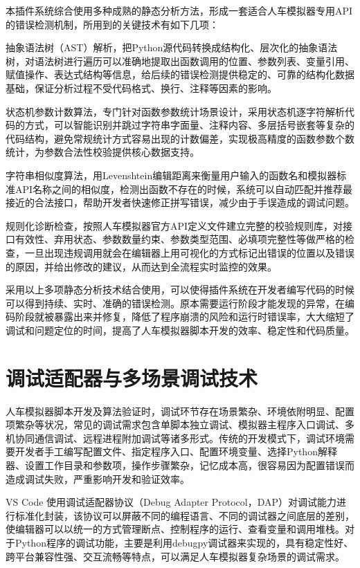 本插件系统综合使用多种成熟的静态分析方法，形成一套适合人车模拟器专用API的错误检测机制，所用到的关键技术有如下几项：

抽象语法树（AST）解析，把Python源代码转换成结构化、层次化的抽象语法树，对语法树进行遍历可以准确地提取出函数调用的位置、参数列表、变量引用、赋值操作、表达式结构等信息，给后续的错误检测提供稳定的、可靠的结构化数据基础，保证分析过程不受代码格式、换行、注释等因素的影响。

状态机参数计数算法，专门针对函数参数统计场景设计，采用状态机逐字符解析代码的方式，可以智能识别并跳过字符串字面量、注释内容、多层括号嵌套等复杂的代码结构，避免常规统计方式容易出现的计数偏差，实现极高精度的函数参数个数统计，为参数合法性校验提供核心数据支持。

字符串相似度算法，用Levenshtein编辑距离来衡量用户输入的函数名和模拟器标准API名称之间的相似度，检测出函数不存在的时候，系统可以自动匹配并推荐最接近的合法接口，帮助开发者快速修正拼写错误，减少由于手误造成的调试问题。

规则化诊断检查，按照人车模拟器官方API定义文件建立完整的校验规则库，对接口有效性、弃用状态、参数数量约束、参数类型范围、必填项完整性等做严格的检查，一旦出现违规调用就会在编辑器上用可视化的方式标记出错误的位置以及错误的原因，并给出修改的建议，从而达到全流程实时监控的效果。

采用以上多项静态分析技术结合使用，可以使得插件系统在开发者编写代码的时候可以得到持续、实时、准确的错误检测。原本需要运行阶段才能发现的异常，在编码阶段就被暴露出来并修复，降低了程序崩溃的风险和运行时错误率，大大缩短了调试和问题定位的时间，提高了人车模拟器脚本开发的效率、稳定性和代码质量。

\section{调试适配器与多场景调试技术}

人车模拟器脚本开发及算法验证时，调试环节存在场景繁杂、环境依附明显、配置项繁杂等状况，常见的调试需求包含单脚本独立调试、模拟器主程序入口调试、多机协同通信调试、远程进程附加调试等诸多形式。传统的开发模式下，调试环境需要开发者手工编写配置文件、指定程序入口、配置环境变量、选择Python解释器、设置工作目录和参数项，操作步骤繁杂，记忆成本高，很容易因为配置错误而造成调试失败，严重影响开发和验证效率。

VS Code 使用调试适配器协议（Debug Adapter
Protocol，DAP）对调试能力进行标准化封装，该协议可以屏蔽不同的编程语言、不同的调试器之间底层的差别，使编辑器可以以统一的方式管理断点、控制程序的运行、查看变量和调用堆栈。对于Python程序的调试功能，主要是利用debugpy调试器来实现的，具有稳定性好、跨平台兼容性强、交互流畅等特点，可以满足人车模拟器复杂场景的调试需求。

